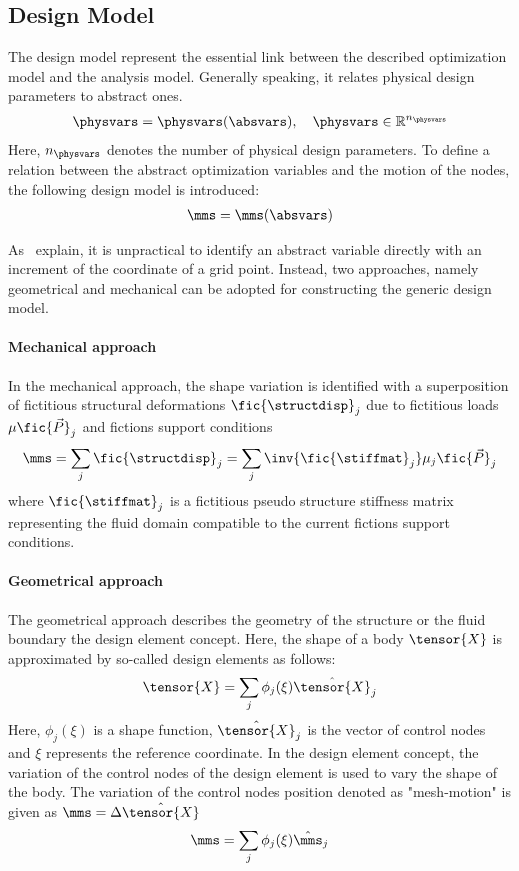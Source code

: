 \documentclass[../main.tex]{subfiles}
\begin{document}
%
\subsection{Design Model}\label{sec:design_model}
The design model represent the essential link between the described optimization model and the analysis model. Generally speaking, it relates physical design parameters to abstract ones.
\begin{align}
\physvars=\physvars(\absvars),~~~\physvars \in \mathbb{R}^{n_{\physvars}} \label{eq:physvarsTOabsvars}
\end{align}
Here, $n_{\physvars}$ denotes the number of physical design parameters.
To define a relation between the abstract optimization variables and the motion of the nodes, the following design model is introduced:
\begin{align}
\mms=\mms(\absvars)
\end{align}

As~\cite{Maute2001} explain, it is unpractical to identify an abstract variable directly with an increment of the coordinate of a grid point. Instead, two approaches, namely geometrical and mechanical can be adopted for constructing the generic design model.
\paragraph{Mechanical approach}
In the mechanical approach, the shape variation is identified with a superposition of fictitious structural deformations $\fic{\structdisp}_{j}$ due to fictitious loads $\mu \fic{\vec{P}}_{j}$ and fictions support conditions
\begin{align}
\mms=\sum_j \fic{\structdisp}_j = \sum_j \inv{\fic{\stiffmat}_j} \mu_j \fic{\vec{P}}_{j} \label{eq:mechanical_approach}
\end{align}
where $\fic{\stiffmat}_j$ is a fictitious pseudo structure stiffness matrix representing the fluid domain compatible to the current fictions support conditions.

\paragraph{Geometrical approach}
The geometrical approach describes the geometry of the structure or the fluid boundary the design element concept. Here, the shape of a body $\tensor{X}$ is approximated by so-called design elements as follows:
\begin{align}
\tensor{X}=\sum_{j} \phi_{j}(\xi) \hat{\tensor{X}}_j \label{eq:geometrical_approach}
\end{align}
Here, $\phi_{j}(\xi)$ is a shape function, $\hat{\tensor{X}}_j$ is the vector of control nodes and $\xi$ represents the reference coordinate. In the design element concept, the variation of the control nodes of the design element is used to vary the shape of the body. The variation of the control nodes position denoted as "mesh-motion" is given as $\mms=\Delta \hat{\tensor{X}} $
\begin{align}
\mms = \sum_j \phi_{j}(\xi) \hat{\mms}_j \label{eq:mms}
\end{align}
\end{document}
